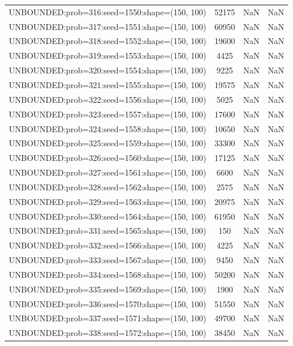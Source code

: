\begin{longtable}{lccc}
UNBOUNDED:prob=316:seed=1550:shape=(150, 100) & 52175 &   NaN &    NaN \\
UNBOUNDED:prob=317:seed=1551:shape=(150, 100) & 60950 &   NaN &    NaN \\
UNBOUNDED:prob=318:seed=1552:shape=(150, 100) & 19600 &   NaN &    NaN \\
UNBOUNDED:prob=319:seed=1553:shape=(150, 100) &  4425 &   NaN &    NaN \\
UNBOUNDED:prob=320:seed=1554:shape=(150, 100) &  9225 &   NaN &    NaN \\
UNBOUNDED:prob=321:seed=1555:shape=(150, 100) & 19575 &   NaN &    NaN \\
UNBOUNDED:prob=322:seed=1556:shape=(150, 100) &  5025 &   NaN &    NaN \\
UNBOUNDED:prob=323:seed=1557:shape=(150, 100) & 17600 &   NaN &    NaN \\
UNBOUNDED:prob=324:seed=1558:shape=(150, 100) & 10650 &   NaN &    NaN \\
UNBOUNDED:prob=325:seed=1559:shape=(150, 100) & 33300 &   NaN &    NaN \\
UNBOUNDED:prob=326:seed=1560:shape=(150, 100) & 17125 &   NaN &    NaN \\
UNBOUNDED:prob=327:seed=1561:shape=(150, 100) &  6600 &   NaN &    NaN \\
UNBOUNDED:prob=328:seed=1562:shape=(150, 100) &  2575 &   NaN &    NaN \\
UNBOUNDED:prob=329:seed=1563:shape=(150, 100) & 20975 &   NaN &    NaN \\
UNBOUNDED:prob=330:seed=1564:shape=(150, 100) & 61950 &   NaN &    NaN \\
UNBOUNDED:prob=331:seed=1565:shape=(150, 100) &   150 &   NaN &    NaN \\
UNBOUNDED:prob=332:seed=1566:shape=(150, 100) &  4225 &   NaN &    NaN \\
UNBOUNDED:prob=333:seed=1567:shape=(150, 100) &  9450 &   NaN &    NaN \\
UNBOUNDED:prob=334:seed=1568:shape=(150, 100) & 50200 &   NaN &    NaN \\
UNBOUNDED:prob=335:seed=1569:shape=(150, 100) &  1900 &   NaN &    NaN \\
UNBOUNDED:prob=336:seed=1570:shape=(150, 100) & 51550 &   NaN &    NaN \\
UNBOUNDED:prob=337:seed=1571:shape=(150, 100) & 49700 &   NaN &    NaN \\
UNBOUNDED:prob=338:seed=1572:shape=(150, 100) & 38450 &   NaN &    NaN \\

\end{longtable}
